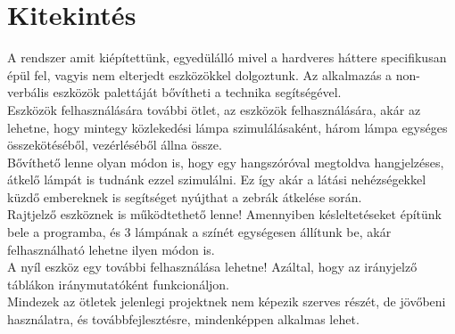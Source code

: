\documentclass[tocnopagenum]{thesis-ekf}
\theoremstyle{definition}
\theoremstyle{remark}
\begin{document}
	\chapter*{Kitekintés}
	A rendszer amit kiépítettünk, egyedülálló mivel a hardveres háttere specifikusan épül fel, vagyis nem elterjedt eszközökkel dolgoztunk. Az alkalmazás a non-verbális eszközök palettáját bővítheti a technika segítségével. 
	\\
	Eszközök felhasználására további ötlet, az eszközök felhasználására, akár az lehetne, hogy mintegy közlekedési lámpa szimulálásaként, három lámpa egységes összekötéséből, vezérléséből állna össze. 
	\\
	Bővíthető lenne olyan módon is, hogy egy hangszóróval megtoldva hangjelzéses, átkelő lámpát is tudnánk ezzel szimulálni. Ez így akár a látási nehézségekkel küzdő embereknek is segítséget nyújthat a zebrák átkelése során.
	\\
	Rajtjelző eszköznek is működtethető lenne! Amennyiben késleltetéseket építünk bele a programba, és 3 lámpának a színét egységesen állítunk be, akár felhasználható lehetne ilyen módon is. 
	\\
	A nyíl eszköz egy további felhasználása lehetne! Azáltal, hogy az irányjelző táblákon iránymutatóként funkcionáljon.
	\\
	Mindezek az ötletek jelenlegi projektnek nem képezik szerves részét, de jövőbeni használatra, és továbbfejlesztésre, mindenképpen alkalmas lehet.
	
	
	

\end{document}
